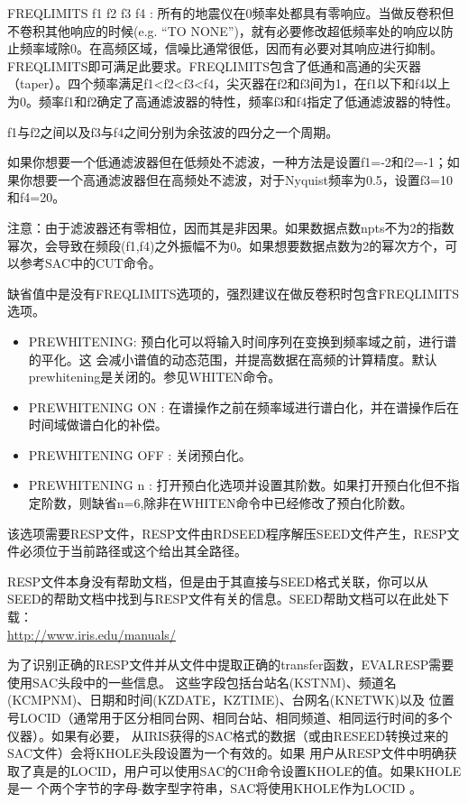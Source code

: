 FREQLIMITS f1 f2 f3 f4 : 所有的地震仪在0频率处都具有零响应。当做反卷积但不卷积其他响应的时候(e.g. ``TO NONE'')，就有必要修改超低频率处的响应以防止频率域除0。在高频区域，信噪比通常很低，因而有必要对其响应进行抑制。FREQLIMITS即可满足此要求。FREQLIMITS包含了低通和高通的尖灭器（taper）。四个频率满足f1<f2<f3<f4，尖灭器在f2和f3间为1，在f1以下和f4以上为0。频率f1和f2确定了高通滤波器的特性，频率f3和f4指定了低通滤波器的特性。

f1与f2之间以及f3与f4之间分别为余弦波的四分之一个周期。

如果你想要一个低通滤波器但在低频处不滤波，一种方法是设置f1=-2和f2=-1；如果你想要一个高通滤波器但在高频处不滤波，对于Nyquist频率为0.5，设置f3=10和f4=20。

注意：由于滤波器还有零相位，因而其是非因果。如果数据点数npts不为2的指数幂次，会导致在频段(f1,f4)之外振幅不为0。如果想要数据点数为2的幂次方个，可以参考SAC中的CUT命令。

缺省值中是没有FREQLIMITS选项的，强烈建议在做反卷积时包含FREQLIMITS选项。
\begin{itemize}
\item PREWHITENING: 预白化可以将输入时间序列在变换到频率域之前，进行谱的平化。这	会减小谱值的动态范围，并提高数据在高频的计算精度。默认prewhitening是关闭的。参见WHITEN命令。
\item PREWHITENING ON : 在谱操作之前在频率域进行谱白化，并在谱操作后在时间域做谱白化的补偿。
\item PREWHITENING OFF : 关闭预白化。
\item PREWHITENING n : 打开预白化选项并设置其阶数。如果打开预白化但不指定阶数，则缺省n=6,除非在WHITEN命令中已经修改了预白化阶数。
\end{itemize}

该选项需要RESP文件，RESP文件由RDSEED程序解压SEED文件产生，RESP文件必须位于当前路径或这个给出其全路径。

RESP文件本身没有帮助文档，但是由于其直接与SEED格式关联，你可以从SEED的帮助文档中找到与RESP文件有关的信息。SEED帮助文档可以在此处下载：\\
\href{http://www.iris.edu/manuals/}{http://www.iris.edu/manuals/}

为了识别正确的RESP文件并从文件中提取正确的transfer函数，EVALRESP需要使用SAC头段中的一些信息。
这些字段包括台站名(KSTNM)、频道名(KCMPNM)、日期和时间(KZDATE，KZTIME)、台网名(KNETWK)以及
位置号LOCID（通常用于区分相同台网、相同台站、相同频道、相同运行时间的多个仪器）。如果有必要，
从IRIS获得的SAC格式的数据（或由RESEED转换过来的SAC文件）会将KHOLE头段设置为一个有效的。如果
用户从RESP文件中明确获取了真是的LOCID，用户可以使用SAC的CH命令设置KHOLE的值。如果KHOLE是一
个两个字节的字母-数字型字符串，SAC将使用KHOLE作为LOCID 。


